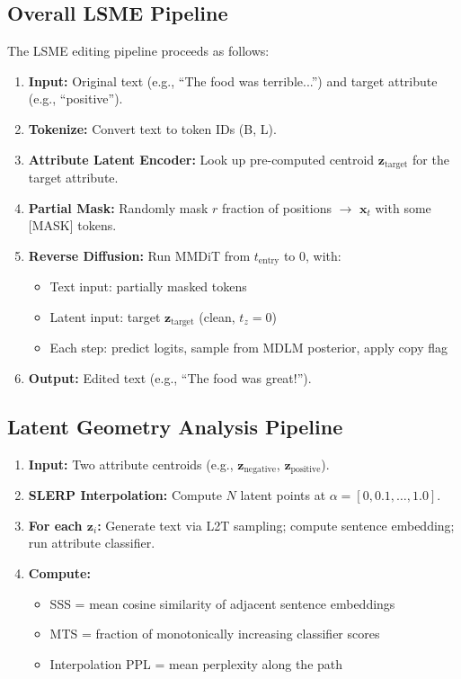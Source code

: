 \documentclass{article}
\begin{document}
\subsection{Overall LSME Pipeline}

The LSME editing pipeline proceeds as follows:

\begin{enumerate}
    \item \textbf{Input:} Original text (e.g., ``The food was terrible...'') and target attribute (e.g., ``positive'').
    \item \textbf{Tokenize:} Convert text to token IDs (B, L).
    \item \textbf{Attribute Latent Encoder:} Look up pre-computed centroid $\mathbf{z}_\text{target}$ for the target attribute.
    \item \textbf{Partial Mask:} Randomly mask $r$ fraction of positions $\to$ $\mathbf{x}_t$ with some [MASK] tokens.
    \item \textbf{Reverse Diffusion:} Run MMDiT from $t_\text{entry}$ to 0, with:
    \begin{itemize}
        \item Text input: partially masked tokens
        \item Latent input: target $\mathbf{z}_\text{target}$ (clean, $t_z = 0$)
        \item Each step: predict logits, sample from MDLM posterior, apply copy flag
    \end{itemize}
    \item \textbf{Output:} Edited text (e.g., ``The food was great!'').
\end{enumerate}

\subsection{Latent Geometry Analysis Pipeline}

\begin{enumerate}
    \item \textbf{Input:} Two attribute centroids (e.g., $\mathbf{z}_\text{negative}$, $\mathbf{z}_\text{positive}$).
    \item \textbf{SLERP Interpolation:} Compute $N$ latent points at $\alpha = [0, 0.1, \ldots, 1.0]$.
    \item \textbf{For each $\mathbf{z}_i$:} Generate text via L2T sampling; compute sentence embedding; run attribute classifier.
    \item \textbf{Compute:}
    \begin{itemize}
        \item SSS = mean cosine similarity of adjacent sentence embeddings
        \item MTS = fraction of monotonically increasing classifier scores
        \item Interpolation PPL = mean perplexity along the path
    \end{itemize}
\end{enumerate}
\end{document}

